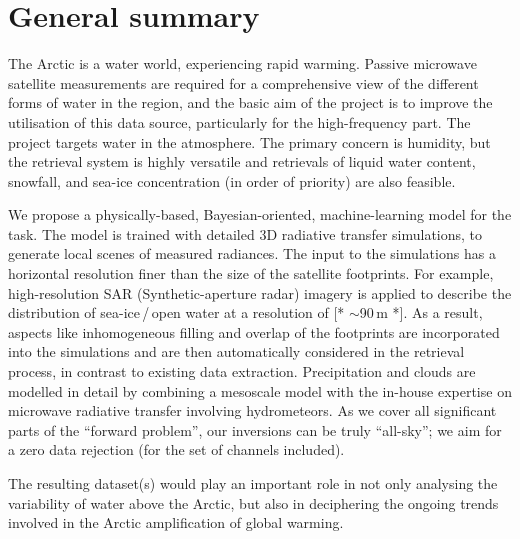 \documentclass[12pt,oneside,a4paper]{article}
\newcommand\intodo[1]{{\color{red} [* #1 *]}}
\begin{document}
	
	
	\thispagestyle{empty}
	\vspace*{-10mm}
	\noindent
	\textbf{\Large \LongTitle}




\section{General summary}
%
The Arctic is a water world, experiencing rapid warming. Passive microwave
satellite measurements are required for a comprehensive view of the different forms of water in the region, and the basic aim of the project is to improve the utilisation of this data source, particularly for the high-frequency part. The project targets water in the atmosphere. The primary concern is humidity, but the retrieval system is highly versatile and retrievals of liquid water content,
snowfall, and sea-ice concentration (in order of priority) are also feasible.

We propose a physically-based, Bayesian-oriented, machine-learning model for
the task. The model is trained with detailed 3D radiative transfer simulations,
to generate local scenes of measured radiances. The input to the simulations
has a horizontal resolution finer than the size of the satellite footprints.
For example, high-resolution SAR (Synthetic-aperture radar) imagery is applied to describe the
distribution of sea-ice\,/\,open water at a resolution of \intodo{$\sim$90\,m}. As a result,
aspects like inhomogeneous filling and overlap of the footprints are
incorporated into the simulations and are then automatically considered in the
retrieval process, in contrast to existing data extraction. Precipitation and
clouds are modelled in detail by combining a mesoscale model with the in-house
expertise on microwave radiative transfer involving hydrometeors. As we cover
all significant parts of the ``forward problem'', our inversions can be truly
``all-sky''; we aim for a zero data rejection (for the set of channels
included).

The resulting dataset(s) would play an important role in not only analysing the
variability of water above the Arctic, but also in deciphering the
ongoing trends involved in the Arctic amplification of global warming.
\end{document}
